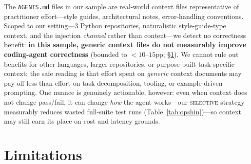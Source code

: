 \documentclass[11pt]{article}
\newcommand{\agentsmd}{\texttt{AGENTS.md}}
\newcommand{\selective}{\textsc{selective}}
\begin{document}
The \agentsmd{} files in our sample are real-world context files representative of practitioner effort---style guides, architectural notes, error-handling conventions.
Scoped to our setting---3 Python repositories, naturalistic style-guide-type context, and the injection \emph{channel} rather than content---we detect no correctness benefit: \textbf{in this sample, generic context files do not measurably improve coding-agent correctness} (bounded to ${<}10$--$15$pp; \S\ref{sec:limitations}).
We cannot rule out benefits for other languages, larger repositories, or purpose-built task-specific context; the safe reading is that effort spent on \emph{generic} context documents may pay off less than effort on task decomposition, tooling, or example-driven prompting.
One nuance is genuinely actionable, however: even when context does not change pass/fail, it can change \emph{how} the agent works---our \selective{} strategy measurably reduces wasted full-suite test runs (Table~\ref{tab:opshin})---so context may still earn its place on cost and latency grounds.

\section{Limitations}
\label{sec:limitations}
\end{document}

